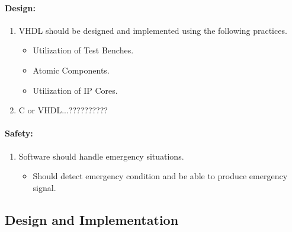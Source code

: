 \paragraph{Design:}
\begin{enumerate}[resume]
	\item VHDL should be designed and implemented using the following practices.
	\begin{itemize}
		\item Utilization of Test Benches.
		\item Atomic Components.
		\item Utilization of IP Cores.
	\end{itemize}
	\item C or VHDL...??????????
\end{enumerate}
\paragraph{Safety:}
\begin{enumerate}[resume]
	\item Software should handle emergency situations.
	\begin{itemize}
		\item Should detect emergency condition and be able to produce emergency signal.
	\end{itemize}
\end{enumerate}

\subsection{Design and Implementation} %
\label{sub:implementation}
